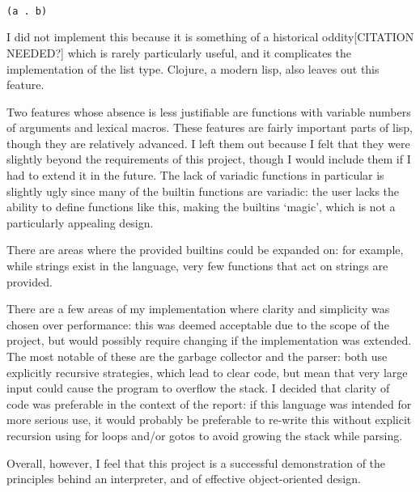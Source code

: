 \documentclass[12pt]{article}
\begin{document}
\begin{lstlisting}

(a . b)

\end{lstlisting}

I did not implement this because it is something of a historical
oddity[CITATION NEEDED?] which is rarely particularly useful, and it
complicates the implementation of the list type. Clojure, a modern
lisp, also leaves out this feature.



Two features whose absence is less justifiable are functions with
variable numbers of arguments and lexical macros. These features are
fairly important parts of lisp, though they are relatively advanced. I
left them out because I felt that they were slightly beyond the
requirements of this project, though I would include them if I had to
extend it in the future. The lack of variadic functions in particular
is slightly ugly since many of the builtin functions are variadic: the
user lacks the ability to define functions like this, making the
builtins `magic', which is not a particularly appealing design.

There are areas where the provided builtins could be expanded on: for
example, while strings exist in the language, very few functions that
act on strings are provided.


There are a few areas of my implementation where clarity and
simplicity was chosen over performance: this was deemed acceptable due
to the scope of the project, but would possibly require changing if
the implementation was extended. The most notable of these are the
garbage collector and the parser: both use explicitly recursive
strategies, which lead to clear code, but mean that very large input
could cause the program to overflow the stack. I decided that clarity
of code was preferable in the context of the report: if this language
was intended for more serious use, it would probably be preferable to
re-write this without explicit recursion using for loops and/or gotos
to avoid growing the stack while parsing.

Overall, however, I feel that this project is a successful
demonstration of the principles behind an interpreter, and of
effective object-oriented design. 
\end{document}
